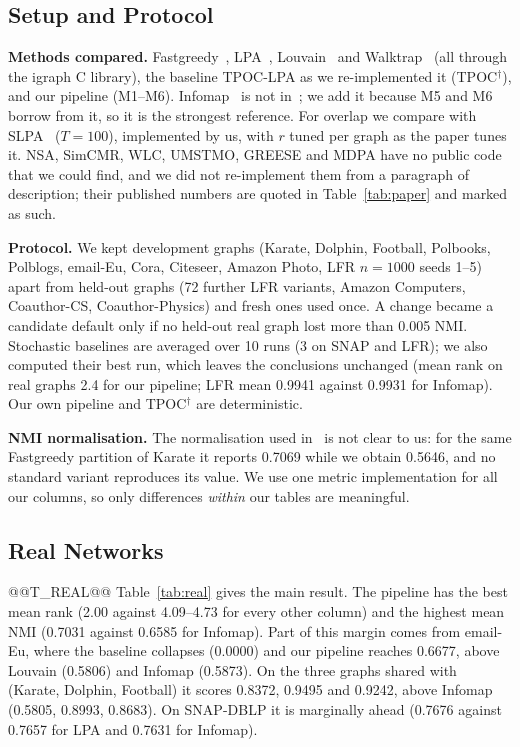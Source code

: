 \documentclass[conference]{IEEEtran}
\begin{document}
\subsection{Setup and Protocol}\label{sec:setup}
\textbf{Methods compared.} Fastgreedy~\cite{clauset2004}, LPA~\cite{raghavan2007}, Louvain~\cite{blondel2008} and Walktrap~\cite{pons2006} (all through the igraph C library), the baseline TPOC-LPA as we re-implemented it (TPOC$^{\dagger}$), and our pipeline (M1--M6). Infomap~\cite{rosvall2008} is not in~\cite{kong2026}; we add it because M5 and M6 borrow from it, so it is the strongest reference. For overlap we compare with SLPA~\cite{xie2011} ($T{=}100$), implemented by us, with $r$ tuned per graph as the paper tunes it. NSA, SimCMR, WLC, UMSTMO, GREESE and MDPA have no public code that we could find, and we did not re-implement them from a paragraph of description; their published numbers are quoted in Table~\ref{tab:paper} and marked as such.

\textbf{Protocol.} We kept development graphs (Karate, Dolphin, Football, Polbooks, Polblogs, email-Eu, Cora, Citeseer, Amazon Photo, LFR $n{=}1000$ seeds 1--5) apart from held-out graphs (72 further LFR variants, Amazon Computers, Coauthor-CS, Coauthor-Physics) and fresh ones used once. A change became a candidate default only if no held-out real graph lost more than 0.005 NMI. Stochastic baselines are averaged over 10 runs (3 on SNAP and LFR); we also computed their best run, which leaves the conclusions unchanged (mean rank on real graphs 2.4 for our pipeline; LFR mean 0.9941 against 0.9931 for Infomap). Our own pipeline and TPOC$^{\dagger}$ are deterministic.

\textbf{NMI normalisation.} The normalisation used in~\cite{kong2026} is not clear to us: for the same Fastgreedy partition of Karate it reports 0.7069 while we obtain 0.5646, and no standard variant reproduces its value. We use one metric implementation for all our columns, so only differences \emph{within} our tables are meaningful.

\subsection{Real Networks}
@@T_REAL@@
Table~\ref{tab:real} gives the main result. The pipeline has the best mean rank (2.00 against 4.09--4.73 for every other column) and the highest mean NMI (0.7031 against 0.6585 for Infomap). Part of this margin comes from email-Eu, where the baseline collapses (0.0000) and our pipeline reaches 0.6677, above Louvain (0.5806) and Infomap (0.5873). On the three graphs shared with~\cite{kong2026} (Karate, Dolphin, Football) it scores 0.8372, 0.9495 and 0.9242, above Infomap (0.5805, 0.8993, 0.8683). On SNAP-DBLP it is marginally ahead (0.7676 against 0.7657 for LPA and 0.7631 for Infomap).
\end{document}
